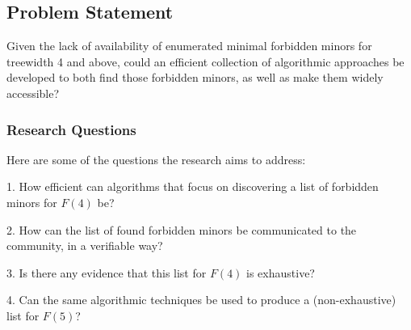 \subsection{Problem Statement }
Given the lack of availability of enumerated minimal forbidden minors for treewidth 4 and above, could an efficient collection of algorithmic approaches be developed to both find those forbidden minors, as well as make them widely accessible?

\subsubsection{Research Questions}
Here are some of the questions the research aims to address:

1. How efficient can algorithms that focus on discovering a list of forbidden minors for $F(4)$ be?

2. How can the list of found forbidden minors be communicated to the community, in a verifiable way?

3. Is there any evidence that this list for $F(4)$ is exhaustive?

4. Can the same algorithmic techniques be used to produce a (non-exhaustive) list for $F(5)$?

